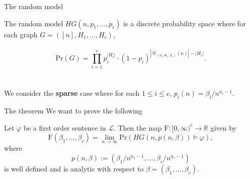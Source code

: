 \documentclass[11pt]{beamer}
\newcommand{\R}{\mathbb{R}}
\newcommand{\Ln}{\lim\limits_{n\to \infty}}
\begin{document}
	\begin{frame}{The random model}

	The random model $HG(n,p_1,\dots, p_c)$ is a discrete probability space where for each graph 
	$G=([n],H_1,\dots,H_c)$,
	\\~\\
	\[ \mathrm{Pr}(G)=\prod_{i=1}^{c} p_i^{|H_i|}\cdot (1-p_i)^{|\mathcal{H}_{(a_i,\Phi_i,A_i)}(n)|-|H_i|} . \]
	~\\~\\
	We consider the \textbf{sparse} case where for each $1\leq i \leq c$,  $p_i(n)=\beta_i/n^{a_i-1}$.

	
	\end{frame}
	
	\begin{frame}{The theorem}
		We want to prove the following
		
		\begin{theorem} Let $\varphi$ be a first order sentence in $\mathcal{L}$.
			Then the map $\mathrm{F}:[0,\infty)^c\rightarrow \R$ given by
			\[ \mathrm{F}(\beta_1,\dots, \beta_c)= \Ln 
			\mathrm{Pr}(HG(n,p(n,\beta))\models \varphi ),
			\]
			where 	
			\[p(n,\beta):= (\beta_1/n^{a_1-1},\dots, \beta_c/n^{a_c-1}) \]
			is well defined and is analytic with respect to $\beta=(\beta_1,\dots,\beta_c)$. 
		\end{theorem}
		
	\end{frame}
	
\end{document}
